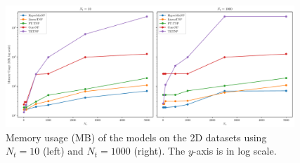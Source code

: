 \documentclass[../../main.tex]{subfiles}
\begin{document}


\begin{figure}[H]
    \centering
    \includegraphics[width=0.97\textwidth]{fig/runtimelinear.pdf}
    \caption{Memory usage (MB) of the models on the 2D datasets using $N_t = 10$ (left) and $N_t = 1000$ (right). The $y$-axis is in log scale.}
    \label{fig:runtime-linear}
\end{figure}
\end{document}
